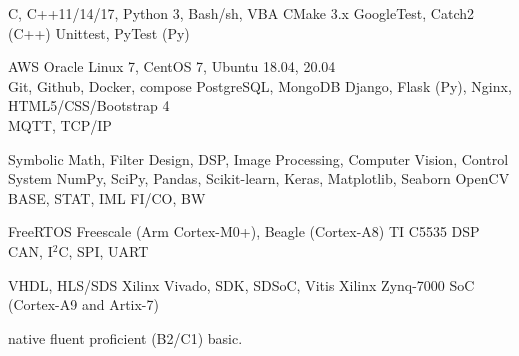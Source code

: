 \documentclass[a4paper]{janus-resume}
\begin{document}
\begin{minipage}[t]{0.49\textwidth}

C, C++11/14/17, Python 3, Bash/sh, VBA
\bluebullet{} CMake 3.x
\bluebullet{} GoogleTest, Catch2 (C++)
\bluebullet{} Unittest, PyTest (Py)\\
\sectionspace %

AWS
\bluebullet{} Oracle Linux 7, CentOS 7, Ubuntu 18.04, 20.04 \\
\bluebullet{} Git, Github, Docker, compose
\bluebullet{} PostgreSQL, MongoDB
\bluebullet{} Django, Flask (Py), Nginx, HTML5/CSS/Bootstrap 4 \\
\bluebullet{} MQTT, TCP/IP
\sectionspace %

 Symbolic Math, Filter Design, DSP, Image Processing, Computer Vision, Control System
\bluebullet {} NumPy, SciPy, Pandas, Scikit-learn, Keras, Matplotlib, Seaborn
\bluebullet {} OpenCV
\bluebullet {} BASE, STAT, IML
\bluebullet {} FI/CO, BW
\sectionspace %

FreeRTOS
\bluebullet{} Freescale (Arm Cortex-M0+), Beagle (Cortex-A8)
\bluebullet{} TI C5535 DSP
\bluebullet{} CAN, I$^2$C, SPI, UART
\sectionspace %

VHDL, HLS/SDS
\bluebullet{} Xilinx Vivado, SDK, SDSoC, Vitis
\bluebullet{} Xilinx Zynq-7000 SoC (Cortex-A9 and Artix-7)
\sectionspace %



 native
\bluebullet {} fluent
\bluebullet {} proficient (B2/C1)
\bluebullet {} basic.


\end{minipage}
\end{document}

